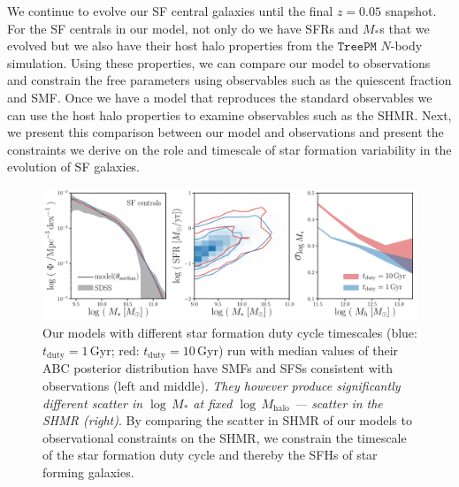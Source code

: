 \documentclass[12pt, letterpaper, preprint, tighten]{aastex}
\begin{document}
We continue to evolve our SF central galaxies until the final $z = 0.05$ 
snapshot. For the SF centrals in our model, not only do we have SFRs and 
$M_*$s that we evolved but we also have their host halo properties from the 
$\mathtt{TreePM}$ $N$-body simulation. Using these properties, we can compare 
our model to observations and constrain the free parameters using observables 
such as the quiescent fraction and SMF. Once we have a model that reproduces 
the standard observables we can use the host halo properties to examine 
observables such as the SHMR. Next, we present this comparison between 
our model and observations and present the constraints we derive on the role 
and timescale of star formation variability in the evolution of SF galaxies.

\begin{figure}
\begin{center}
\includegraphics[width=\textwidth]{figs/qaplot_abc.pdf}
    \caption{Our models with different star formation duty cycle timescales 
    (blue: $t_\mathrm{duty}{=}1\,\mathrm{Gyr}$; red: $t_\mathrm{duty}{=}10\,\mathrm{Gyr}$) 
    run with median values of their ABC posterior distribution have SMFs and SFSs consistent 
    with observations (left and middle). \emph{They however produce significantly different 
    scatter in $\log\,M_*$ at fixed $\log\,M_\mathrm{halo}$ --- scatter in the SHMR (right)}. 
    By comparing the scatter in SHMR of our models to observational constraints on the SHMR, 
    we constrain the timescale of the star formation duty cycle and thereby the SFHs of star 
    forming galaxies.
    }
\label{fig:abc_demo}
\end{center}
\end{figure}
\end{document}
